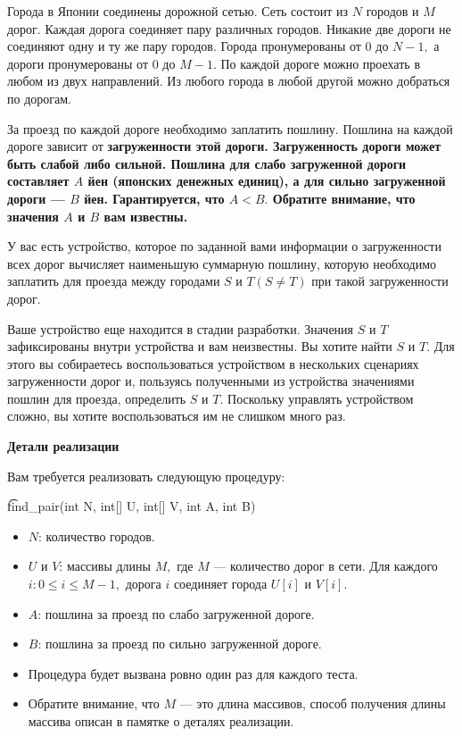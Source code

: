 Города в Японии соединены дорожной сетью. Сеть состоит из $N$ городов и $M$ дорог. Каждая дорога соединяет пару различных городов. Никакие две дороги не соединяют одну и ту же пару городов. Города пронумерованы от $0$ до $N-1,$ а дороги пронумерованы от $0$ до $M-1.$ По каждой дороге можно проехать в любом из двух направлений. Из любого города в любой другой можно добраться по дорогам. 

За проезд по каждой дороге необходимо заплатить пошлину. Пошлина на каждой дороге зависит от \bf{загруженности} этой дороги. Загруженность дороги может быть \bf{слабой} либо \bf{сильной}. Пошлина для слабо загруженной дороги составляет $A$ йен (японских денежных единиц), а для сильно загруженной дороги --- $B$ йен. Гарантируется, что $A < B.$ Обратите внимание, что значения $A$ и $B$ вам известны. 

У вас есть устройство, которое по заданной вами информации о загруженности всех дорог вычисляет наименьшую суммарную пошлину, которую необходимо заплатить для проезда между городами $S$ и $T (S \neq T)$ при такой загруженности дорог. 

Ваше устройство еще находится в стадии разработки. Значения $S$ и $T$ зафиксированы внутри устройства и вам неизвестны. Вы хотите найти $S$ и $T.$ Для этого вы собираетесь воспользоваться устройством в нескольких сценариях загруженности дорог и, пользуясь полученными из устройства значениями пошлин для проезда, определить $S$ и $T.$ Поскольку управлять устройством сложно, вы хотите воспользоваться им не слишком много раз.

\bf{Детали реализации}

Вам требуется реализовать следующую процедуру:

\t{find_pair(int N, int[] U, int[] V, int A, int B)}

\begin{itemize}
\item $N$: количество городов.
\item $U$ и $V$: массивы длины $M,$ где $M$ --- количество дорог в сети. Для каждого $i: 0 \le i \le M-1,$ дорога $i$  соединяет города $U[i]$ и $V[i].$ 
\item $A$: пошлина за проезд по слабо загруженной дороге. 
\item $B$: пошлина за проезд по сильно загруженной дороге.
\item Процедура будет вызвана ровно один раз для каждого теста. 
\item Обратите внимание, что $M$ --- это длина массивов, способ получения длины массива описан в памятке о деталях реализации.
\end{itemize}

